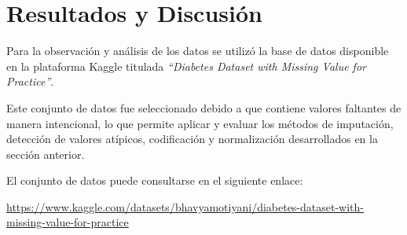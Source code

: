 \documentclass[12pt]{article}
\begin{document}




\section{Resultados y Discusión}

Para la observación y análisis de los datos se utilizó la base de datos disponible en la plataforma Kaggle titulada \textit{``Diabetes Dataset with Missing Value for Practice''}. 

Este conjunto de datos fue seleccionado debido a que contiene valores faltantes de manera intencional, lo que permite aplicar y evaluar los métodos de imputación, detección de valores atípicos, codificación y normalización desarrollados en la sección anterior.

El conjunto de datos puede consultarse en el siguiente enlace:

\url{https://www.kaggle.com/datasets/bhavyamotiyani/diabetes-dataset-with-missing-value-for-practice}
\end{document}
